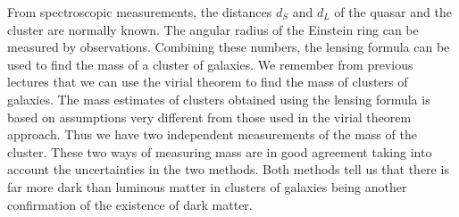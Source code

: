 {\begin{multicols}{2}
From spectroscopic measurements, the distances $d_S$ and $d_L$ of the quasar and the cluster are normally known. The angular radius of the Einstein ring can be measured by observations. Combining these numbers, the lensing formula can be used to find the mass of a cluster of galaxies. We remember from previous lectures that we can use the virial theorem to find the mass of clusters of galaxies. The mass estimates of clusters obtained using the lensing formula is based on assumptions very different from those used in the virial theorem approach. Thus we have two independent measurements of the mass of the cluster. These two ways of measuring mass are in good agreement taking into account the uncertainties in the two methods. Both methods tell us that there is far more dark than luminous matter in clusters of galaxies being another confirmation of the existence of dark matter.
\begin{figure}
\end{figure}
\end{multicols}}

